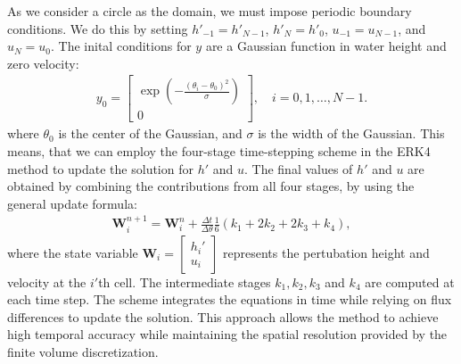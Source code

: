 As we consider a circle as the domain, we must impose periodic boundary conditions.
We do this by setting $h'_{-1} = h'_{N-1}$, $h'_{N} = h'_0$, $u_{-1} = u_{N-1}$, and $u_{N} = u_0$.
The inital conditions for $y$ are a Gaussian function in water height and zero velocity:
\begin{align}
    y_0 = \begin{bmatrix}
        \exp(-\frac{{(\theta_{i} - \theta_0)}^2}{\sigma}) \\ 0
    \end{bmatrix}, \quad i = 0,1, \dots, N-1.
\end{align}
where $\theta_0$ is the center of the Gaussian, and $\sigma$ is the width of the Gaussian.
This means, that we can employ the four-stage time-stepping scheme in the ERK4 method to update the solution for $h'$ and $u$.
The final values of $h'$ and $u$ are obtained by combining the contributions from all four stages, by using the general update formula:
\begin{align*}
    \mathbf{W}_i^{n+1} = \mathbf{W}_i^n + \frac{\Delta t}{\Delta \theta} \frac{1}{6} \left(k_1 + 2 k_2 + 2 k_3 + k_4 \right),
\end{align*}
where the state variable
$\mathbf{W}_i = \begin{bmatrix}
    h_i' \\
    u_i
\end{bmatrix}$ represents the pertubation height and velocity at the $i'$th cell.
The intermediate stages $k_1, k_2, k_3$ and $k_4$ are computed at each time step.
The scheme integrates the equations in time while relying on flux differences to update the solution.
This approach allows the method to achieve high temporal accuracy while maintaining the spatial resolution provided by the finite volume discretization.



